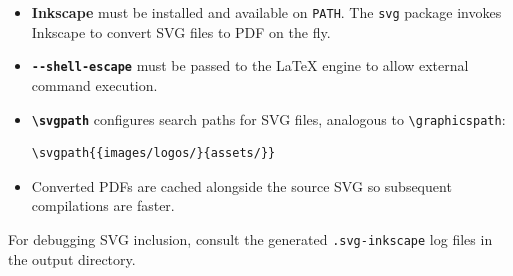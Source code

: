 \begin{itemize}
    \item \textbf{Inkscape} must be installed and available on \verb|PATH|.
          The \texttt{svg} package invokes Inkscape to convert SVG files to
          PDF on the fly.
    \item \textbf{\texttt{-{}-shell-escape}} must be passed to the LaTeX
          engine to allow external command execution.
    \item \textbf{\texttt{\textbackslash svgpath}} configures search paths for
          SVG files, analogous to \verb|\graphicspath|:
\begin{verbatim}
\svgpath{{images/logos/}{assets/}}
\end{verbatim}
    \item Converted PDFs are cached alongside the source SVG so subsequent
          compilations are faster.
\end{itemize}

For debugging SVG inclusion, consult the generated \texttt{.svg-inkscape}
log files in the output directory.
